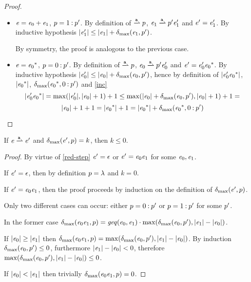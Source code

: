 \begin{theorem}
\begin{proof}
\begin{description}
\begin{itemize}
           By symmetry, the proof is analogous to the
           previous case.
     \item $\mathit {e}=\mathit {e}_0\mathbin{+}\mathit {e}_1$, $p=1\mathbin{:}p'$. By definition
           of $\parDer{\sym}{\tpath}$, $\re_1\parDer{\sym}{\tpath'}\re'_1$ and $\mathit {e}'=\mathit {e}'_1$.
           By inductive hypothesis ${\mid}{\mathit {e}'_1}{\mid}\leq {\mid}{\ensuremath{\mathit {e}}_1}{\mid}+{\delta_{\max}}({\mathit {e}_1},{p'})$.

           By symmetry, the proof is analogous to the
           previous case.

     \item $\mathit {e}={\mathit {e}_0}^*$, $p=0\mathbin{:}p'$. By definition
           of $\parDer{\sym}{\tpath}$, $\re_0\parDer{\sym}{\tpath'}\re'_0$ and $\mathit {e}'=\mathit {e}'_0{\mathit {e}_0}^*$.
           By inductive hypothesis ${\mid}{\mathit {e}'_0}{\mid}\leq {\mid}{\ensuremath{\mathit {e}}_0}{\mid}+{\delta_{\max}}({\mathit {e}_0},{p'})$, hence
           by definition of ${\mid}{\mathit {e}'_0{\mathit {e}_0}^*}{\mid}$, ${\mid}{{\mathit {e}_0}^*}{\mid}$, ${\delta_{\max}}({{\mathit {e}_0}^*},{0\mathbin{:}p'})$ and \cref{inc}
           $$
            {\mid}{\mathit {e}'_0{\mathit {e}_0}^*}{\mid}=\max({\mid}{\mathit {e}'_0}{\mid},{\mid}{\mathit {e}_0}{\mid}+1)+1\leq
            \max({\mid}{\mathit {e}_0}{\mid}+{\delta_{\max}}({\mathit {e}_0},{p'}),{\mid}{\mathit {e}_0}{\mid}+1)+1=$$
           $${\mid}{\mathit {e}_0}{\mid}+1+1=
            {\mid}{{\mathit {e}_0}^*}{\mid}+1={\mid}{{\mathit {e}_0}^*}{\mid}+{\delta_{\max}}({{\mathit {e}_0}^*},{0\mathbin{:}p'})
           $$
    \end{itemize}
  \end{description}
 \end{proof}
\end{theorem}

\begin{theorem}\label{zero-inc}
 If $\re\parDer{\sym}{}\re'$ and ${\delta_{\max}}({\mathit {e}'},{p})=k$, then $k\leq 0$.
 \begin{proof}
  By virtue of \cref{red-step} $\mathit {e}'=\mathtt {\epsilon}$ or $\mathit {e}'=\mathit {e}_0\mathit {e}_1$ for some $\mathit {e}_0,\mathit {e}_1$.

  If $\mathit {e}'=\mathtt {\epsilon}$, then by definition $p=\lambda$ and $k=0$.

  If $\mathit {e}'=\mathit {e}_0\mathit {e}_1$, then the proof proceeds by induction on the definition of ${\delta_{\max}}({\mathit {e}'},{p})$.

  Only two different cases can occur: either $p=0\mathbin{:}p'$ or $p=1\mathbin{:}p'$ for some  $p'$.

  In the former case ${\delta_{\max}}({\mathit {e}_0\mathit {e}_1},{p})=\mathit{geq}({\mathit {e}_0},{\mathit {e}_1})\cdot\max({\delta_{\max}}({\mathit {e}_0},{p'}),{\mid}{\mathit {e}_1}{\mid}-{\mid}{\mathit {e}_0}{\mid})$.

  If ${\mid}{\mathit {e}_0}{\mid}\geq{\mid}{\ensuremath{\mathit {e}}_1}{\mid}$ then ${\delta_{\max}}({\mathit {e}_0\mathit {e}_1},{p})=\max({\delta_{\max}}({\mathit {e}_0},{p'}),{\mid}{\mathit {e}_1}{\mid}-{\mid}{\mathit {e}_0}{\mid})$.
  By induction ${\delta_{\max}}({\mathit {e}_0},{p'})\leq 0$, furthermore ${\mid}{\mathit {e}_1}{\mid}-{\mid}{\mathit {e}_0}{\mid}<0$, therefore $\max({\delta_{\max}}({\mathit {e}_0},{p'}),{\mid}{\mathit {e}_1}{\mid}-{\mid}{\mathit {e}_0}{\mid})\leq 0$.

  If ${\mid}{\mathit {e}_0}{\mid}<{\mid}{\mathit {e}_1}{\mid}$ then trivially ${\delta_{\max}}({\mathit {e}_0\mathit {e}_1},{p})=0$.


 \end{proof}
\end{theorem}
